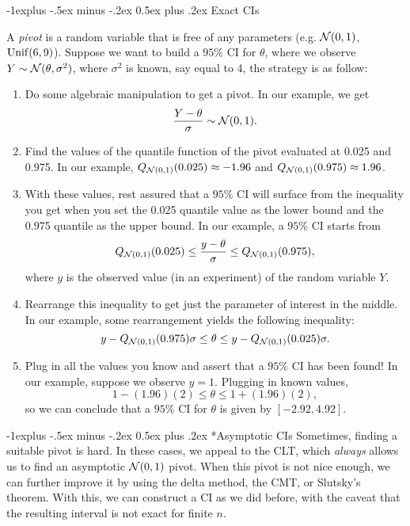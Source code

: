 \documentclass[10pt,landscape]{article}
\makeatletter
\renewcommand{\subsection}{\@startsection{subsection}{2}{0mm}%
                                {-1explus -.5ex minus -.2ex}%
                                {0.5ex plus .2ex}%
                                {\normalfont\normalsize\bfseries}}
\makeatother
\begin{document}
\begin{multicols*}{3}
\subsection{Exact CIs}

A \emph{pivot} is a random variable that is free of any parameters (e.g. $\mathcal{N}(0,1)$, $\operatorname{Unif}(6,9)$). Suppose we want to build a $95\%$ CI for $\theta$, where we observe $Y\sim \mathcal{N}(\theta,\sigma^2)$, where $\sigma^2$ is known, say equal to 4, the strategy is as follow:

\begin{enumerate}
    \item Do some algebraic manipulation to get a pivot. In our example, we get $$\frac{Y-\theta}{\sigma}\sim \mathcal{N}(0,1).$$
    \item Find the values of the quantile function of the pivot evaluated at 0.025 and 0.975. In our example, $Q_{\mathcal{N}(0,1)}(0.025)\approx -1.96$ and $Q_{\mathcal{N}(0,1)}(0.975)\approx 1.96$.
    \item With these values, rest assured that a $95\%$ CI will surface from the inequality you get when you set the 0.025 quantile value as the lower bound and the 0.975 quantile as the upper bound. In our example, a $95\%$ CI starts from $$Q_{\mathcal{N}(0,1)}(0.025)\leq \frac{y-\theta}{\sigma}\leq Q_{\mathcal{N}(0,1)}(0.975),$$ where $y$ is the observed value (in an experiment) of the random variable $Y$.
    \item Rearrange this inequality to get just the parameter of interest in the middle. In our example, some rearrangement yields the following inequality: $$y-Q_{\mathcal{N}(0,1)}(0.975)\sigma\leq \theta\leq y-Q_{\mathcal{N}(0,1)}(0.025)\sigma.$$
    \item Plug in all the values you know and assert that a $95\%$ CI has been found! In our example, suppose we observe $y=1$. Plugging in known values, $$1-(1.96)(2)\leq \theta \leq 1+(1.96)(2),$$ so we can conclude that a $95\%$ CI for $\theta$ is given by $[-2.92,4.92]$. 
\end{enumerate}

\subsection*{Asymptotic CIs}
Sometimes, finding a suitable pivot is hard. In these cases, we appeal to the CLT, which \emph{always} allows us to find an asymptotic $\mathcal{N}(0,1)$ pivot. When this pivot is not nice enough, we can further improve it by using the delta method, the CMT, or Slutsky's theorem. With this, we can construct a CI as we did before, with the caveat that the resulting interval is not exact for finite $n$.


\end{multicols*}
\end{document}
